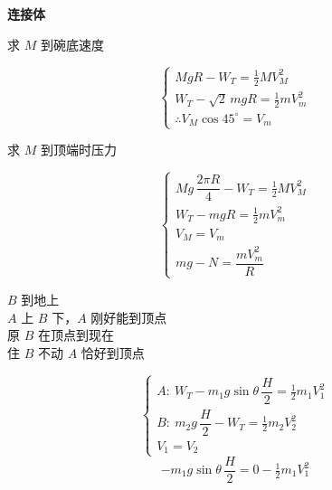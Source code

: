 \textbf{连接体}
\begin{problem}[①]
求 $M$ 到碗底速度
\begin{solution}
\[
\begin{cases}
MgR-W_T=\tfrac12 MV_M^2\\
W_T-\sqrt2\,mgR=\tfrac12 mV_m^2\\
\therefore V_M\cos45^\circ=V_m
\end{cases}
\]
\end{solution}
\end{problem}
\begin{problem}[②]
求 $M$ 到顶端时压力
\begin{solution}
\[
\begin{cases}
Mg\,\dfrac{2\pi R}{4}-W_T=\tfrac12 MV_M^2\\[4pt]
W_T-mgR=\tfrac12 mV_m^2\\[2pt]
V_M=V_m\\
mg-N=\dfrac{mV_m^2}{R}
\end{cases}
\]
\end{solution}
\end{problem}
\begin{problem}
$B$ 到地上\\
$A$ 上 $B$ 下，$A$ 刚好能到顶点\\
原 $B$ 在顶点到现在\\
住 $B$ 不动 $A$ 恰好到顶点
\begin{solution}
\[
\begin{cases}
A:\ W_T-m_1g\sin\theta\,\dfrac{H}{2}=\tfrac12 m_1V_1^2\\[4pt]
B:\ m_2g\,\dfrac{H}{2}-W_T=\tfrac12 m_2V_2^2\\[4pt]
V_1=V_2
\end{cases}
\]
\[
-m_1g\sin\theta\,\dfrac{H}{2}=0-\tfrac12 m_1V_1^2
\]
\end{solution}
\end{problem}
